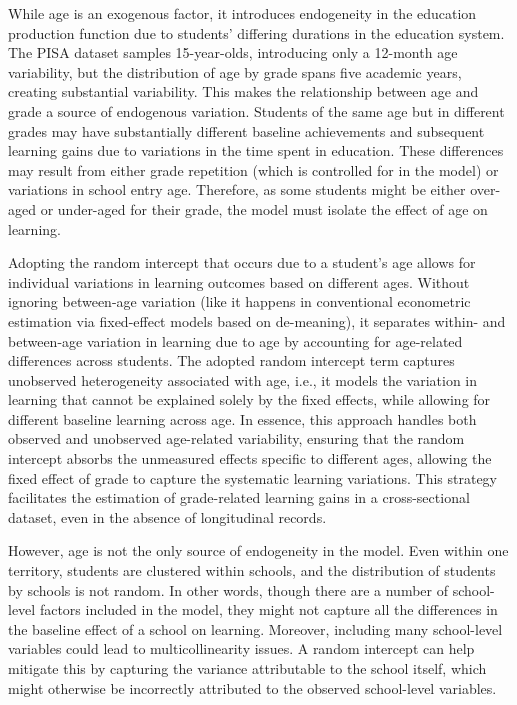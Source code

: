 \documentclass[
]{article}
\begin{document}
While age is an exogenous factor, it introduces endogeneity in the
education production function due to students' differing durations in
the education system. The PISA dataset samples 15-year-olds, introducing
only a 12-month age variability, but the distribution of age by grade
spans five academic years, creating substantial variability. This makes
the relationship between age and grade a source of endogenous variation.
Students of the same age but in different grades may have substantially
different baseline achievements and subsequent learning gains due to
variations in the time spent in education. These differences may result
from either grade repetition (which is controlled for in the model) or
variations in school entry age. Therefore, as some students might be
either over-aged or under-aged for their grade, the model must isolate
the effect of age on learning.

Adopting the random intercept that occurs due to a student's age allows
for individual variations in learning outcomes based on different ages.
Without ignoring between-age variation (like it happens in conventional
econometric estimation via fixed-effect models based on de-meaning), it
separates within- and between-age variation in learning due to age by
accounting for age-related differences across students. The adopted
random intercept term captures unobserved heterogeneity associated with
age, i.e., it models the variation in learning that cannot be explained
solely by the fixed effects, while allowing for different baseline
learning across age. In essence, this approach handles both observed and
unobserved age-related variability, ensuring that the random intercept
absorbs the unmeasured effects specific to different ages, allowing the
fixed effect of grade to capture the systematic learning variations.
This strategy facilitates the estimation of grade-related learning gains
in a cross-sectional dataset, even in the absence of longitudinal
records.

However, age is not the only source of endogeneity in the model. Even
within one territory, students are clustered within schools, and the
distribution of students by schools is not random. In other words,
though there are a number of school-level factors included in the model,
they might not capture all the differences in the baseline effect of a
school on learning. Moreover, including many school-level variables
could lead to multicollinearity issues. A random intercept can help
mitigate this by capturing the variance attributable to the school
itself, which might otherwise be incorrectly attributed to the observed
school-level variables.
\end{document}
